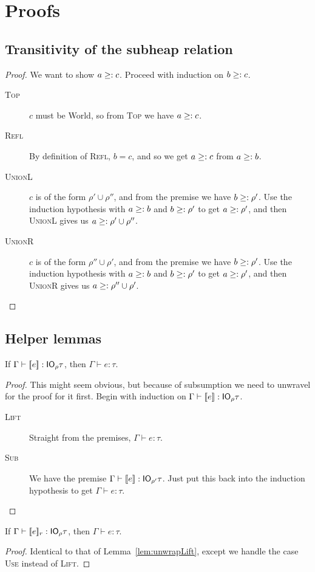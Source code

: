 \appendix
\chapter{Proofs}

\section{Transitivity of the subheap relation}\label{proof:subheaptransitive}
\begin{proof}
  We want to show $a \subtyp c$. Proceed with induction on $b \subtyp c$.
  \begin{description}
  \item[\rm\textsc{Top}]
    $c$ must be \textsf{World}, so from \textsc{Top} we have $a
    \subtyp c$.
  \item[\rm\textsc{Refl}] By definition of \textsc{Refl}, $b =
    c$, and so we get $a \subtyp c$ from $a \subtyp b$.
  \item[\rm\textsc{UnionL}] $c$ is of the form $\rho' \cup \rho''$, and
    from the premise we have $b \subtyp \rho'$. Use the induction
    hypothesis with $a \subtyp b$ and $b \subtyp \rho'$ to get $a \subtyp
    \rho'$, and then \textsc{UnionL} gives us $a \subtyp \rho' \cup \rho''$.
  \item[\rm\textsc{UnionR}]  $c$ is of the form $\rho'' \cup \rho'$, and
    from the premise we have $b \subtyp \rho'$. Use the induction
    hypothesis with $a \subtyp b$ and $b \subtyp \rho'$ to get $a \subtyp
    \rho'$, and then \textsc{UnionR} gives us $a \subtyp \rho'' \cup \rho'$.
  \end{description}
\end{proof}

\section{Helper lemmas}
\begin{lemma}\label{lem:unwrapLift}
  If $\Gamma \vdash \lift{e} : \IO_\rho \tau$, then $\Gamma \vdash e : \tau$.
\end{lemma}

\begin{proof}
  This might seem obvious, but because of subsumption we need to
  unwravel for the proof for it first. Begin with induction on $\Gamma \vdash
  \lift{e} : \IO_\rho \tau$.
  \begin{description}
  \item[\rm\textsc{Lift}] Straight from the premises, $\Gamma \vdash e : \tau$.
  \item[\rm\textsc{Sub}] We have the premise ${\Gamma \vdash \lift{e} : \IO_{\rho'}
    \tau}$. Just put this back into the induction hypothesis to get ${\Gamma \vdash e
    : \tau}$.
  \end{description}
\end{proof}

\begin{lemma}\label{lem:unwrapUse}
  If $\Gamma \vdash \use{r}{e} : \IO_\rho \tau$, then $\Gamma \vdash e : \tau$.
\end{lemma}
\begin{proof}
  Identical to that of Lemma~\ref{lem:unwrapLift}, except we handle
  the case \textsc{Use} instead of \textsc{Lift}.
\end{proof}